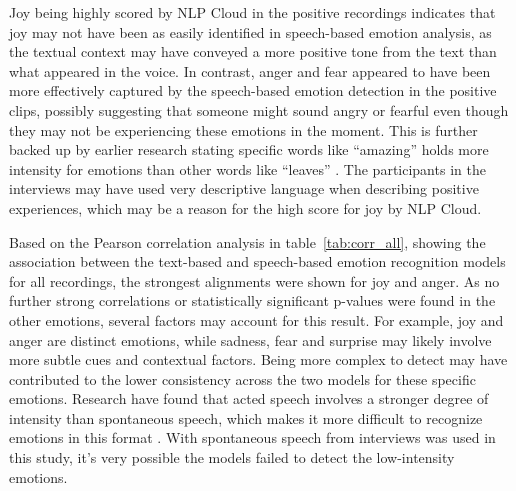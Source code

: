 Joy being highly scored by NLP Cloud in the positive recordings indicates that joy may not have been as easily identified in speech-based emotion analysis, as the textual context may have conveyed a more positive tone from the text than what appeared in the voice. In contrast, anger and fear appeared to have been more effectively captured by the speech-based emotion detection in the positive clips, possibly suggesting that someone might sound angry or fearful even though they may not be experiencing these emotions in the moment. This is further backed up by earlier research stating specific words like “amazing” holds more intensity for emotions than other words like “leaves” \autocite{Chauhan2024}. The participants in the interviews may have used very descriptive language when describing positive experiences, which may be a reason for the high score for joy by NLP Cloud.

Based on the Pearson correlation analysis in table~\ref{tab:corr_all}, showing the association between the text-based and speech-based emotion recognition models for all recordings, the strongest alignments were shown for joy and anger. As no further strong correlations or statistically significant p-values were found in the other emotions, several factors may account for this result. For example, joy and anger are distinct emotions, while sadness, fear and surprise may likely involve more subtle cues and contextual factors. Being more complex to detect may have contributed to the lower consistency across the two models for these specific emotions. Research have found that acted speech involves a stronger degree of intensity than spontaneous speech, which makes it more difficult to recognize emotions in this format \autocite{Chakraborty2016}. With spontaneous speech from interviews was used in this study, it’s very possible the models failed to detect the low-intensity emotions.

